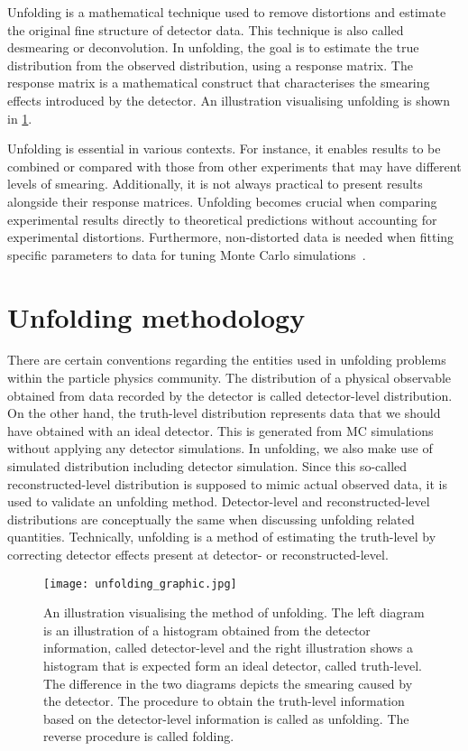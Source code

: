 Unfolding is a mathematical technique used to remove distortions and estimate the original
fine structure of detector data. This technique is also called desmearing or deconvolution.
In unfolding, the goal is to estimate the true distribution from the observed distribution, 
using a response matrix. The response matrix is a mathematical construct that 
characterises the smearing effects introduced by the detector. An illustration visualising 
unfolding is shown in \cref{fig:unf_graphic}.

Unfolding is essential in various contexts. For instance, it enables results to be 
combined or compared with those from other experiments that may have different 
levels of smearing. Additionally, it is not always practical to present results alongside 
their response matrices. Unfolding becomes crucial when comparing experimental 
results directly to theoretical predictions without accounting for experimental 
distortions. Furthermore, non-distorted data is needed when fitting specific parameters to 
data for tuning Monte Carlo simulations~\cite{Lyons:2011cli}.


\section{Unfolding methodology}

There are certain conventions regarding the entities used in unfolding problems within the particle physics 
community. The distribution of a physical observable obtained from data recorded by the detector is called detector-level 
distribution. On the other hand, the truth-level distribution represents data that we should
have obtained with an ideal detector. This is generated from MC simulations without applying any detector
simulations. In unfolding, we also make use of simulated distribution including detector simulation.
Since this so-called reconstructed-level distribution is supposed to mimic actual observed data, it is 
used to validate an unfolding method. Detector-level and reconstructed-level distributions are 
conceptually the same when discussing unfolding related quantities. Technically, unfolding
is a method of estimating the truth-level by correcting detector effects present at detector- or
reconstructed-level.

\begin{figure}
    \centering
        \texttt{[image: unfolding\_graphic.jpg]}
        \caption{An illustration visualising the method of unfolding. The left diagram is an illustration
        of a histogram obtained from the detector information, called detector-level and the right 
        illustration shows a histogram that is expected form an ideal detector, called truth-level.
        The difference in the two diagrams depicts the smearing caused by the detector. The procedure to
        obtain the truth-level information based on the detector-level information is called as 
        unfolding. The reverse procedure is called folding.}
           \label{fig:unf_graphic}
  \end{figure}

